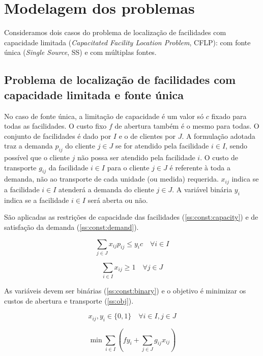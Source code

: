 \documentclass[]{article}
\title{}
\begin{document}
\maketitle

\begin{abstract}

\end{abstract}

\section{Modelagem dos problemas}

	Consideramos dois casos do problema de localização de facilidades com capacidade limitada 
	(\textit{Capacitated Facility Location Problem}, CFLP):
	com fonte única (\textit{Single Source}, SS) 
	e com múltiplas fontes. 
	
	\subsection{Problema de localização de facilidades com capacidade limitada e fonte única}
	
	No caso de fonte única, a limitação de capacidade é um valor só $c$ fixado para todas as facilidades.
	O custo fixo $f$ de abertura também é o mesmo para todas.
	O conjunto de facilidades é dado por $I$ e o de clientes por $J$.
	A formulação adotada traz a demanda $p_{ij}$ do cliente $j \in J$ se for atendido pela facilidade $i \in I$, 
	sendo possível que o cliente $j$ não possa ser atendido pela facilidade $i$.
	O custo de transporte $g_{ij}$ da facilidade $i \in I$ para o cliente $j \in J$ é referente à toda a demanda, não ao transporte de cada unidade (ou medida) requerida.
	$x_{ij}$ indica se a facilidade $i \in I$ atenderá a demanda do cliente $j \in J$.
	A variável binária $y_i$ indica se a facilidade $i \in I$ será aberta ou não.
	
	São aplicadas as restrições de capacidade das facilidades (\ref{ss:const:capacity}) e de satisfação da demanda (\ref{ss:const:demand}).
	
	\begin{equation}
		\label{ss:const:capacity}		
		\sum_{j \in J} x_{ij} p_{ij} \le y_i c 
		\quad
		\forall i \in I
	\end{equation}	

	\begin{equation}
		\label{ss:const:demand}		
		\sum_{i \in I} x_{ij} \ge 1 
		\quad
		\forall j \in J
	\end{equation}

	As variáveis devem ser binárias (\ref{ss:const:binary}) 
	e o objetivo é minimizar os custos de abertura e transporte (\ref{ss:obj}).
	
	\begin{equation}
		\label{ss:const:binary}		
		x_{ij}, y_i \in \{0, 1\}
		\quad
		\forall i \in I, j \in J
	\end{equation}	
	
	\begin{equation}
		\label{ss:obj}		
		\min \sum_{i \in I} 
		(
			f y_i + \sum_{j \in J} g_{ij} x_{ij}
		)
	\end{equation}
\end{document}

